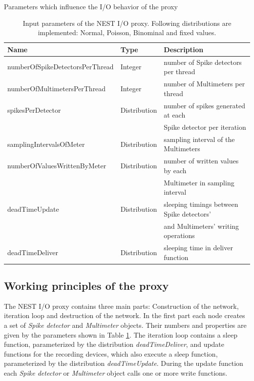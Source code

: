 \documentclass[]{YIC2015}
\begin{document}
\begin{table}[b]
\caption{Parameters which influence the I/O behavior of the proxy}
\centering
\begin{tabular}{lll}
\hline\hline
\textbf{Name}                   & \textbf{Type} & \textbf{Description} \\ \hline
numberOfSpikeDetectorsPerThread & Integer       & number of Spike detectors per thread  \\
numberOfMultimetersPerThread    & Integer       & number of Multimeters per thread  \\
spikesPerDetector               & Distribution  & number of spikes generated at each \\
        &           & Spike detector per iteration  \\
samplingIntervalsOfMeter        & Distribution  & sampling interval of the Multimeters  \\
numberOfValuesWrittenByMeter    & Distribution  & number of written values by each \\
        &           & Multimeter in sampling interval  \\
deadTimeUpdate                  & Distribution  & sleeping timings between Spike detectors' \\
        &           & and Multimeters' writing operations \\
deadTimeDeliver                 & Distribution  & sleeping time in deliver function  \\
\hline\hline
\end{tabular}
\label{tab:table-silva1}
\caption{Input parameters of the NEST I/O proxy. Following distributions
  are implemented: Normal, Poisson, Binominal and fixed values.}
\end{table}

\subsection{Working principles of the proxy}

The NEST I/O proxy contains three main parts: Construction of the
network, iteration loop and destruction of the network. In the first
part each node creates a set of \emph{Spike detector} and
\emph{Multimeter} objects. Their numbers and properties are given by
the parameters shown in Table \ref{tab:table-silva1}. The iteration
loop contains a sleep function, parameterized by the distribution
\emph{deadTimeDeliver}, and update functions for the recording
devices, which also execute a sleep function, parameterized by the
distribution \emph{deadTimeUpdate}. During the update function each
\emph{Spike detector} or \emph{Multimeter} object calls one or more
write functions.
\end{document}
